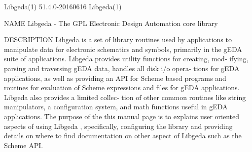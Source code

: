 Libgeda(1)                      51.4.0-20160616                     Libgeda(1)



NAME
       Libgeda - The GPL Electronic Design Automation core library

DESCRIPTION
       Libgeda is a set of library routines used by applications to manipulate
       data for electronic schematics and symbols, primarily in the gEDA suite
       of applications.  Libgeda provides utility functions for creating, mod-
       ifying, parsing and traversing gEDA data, handles all disk  i/o  opera-
       tions  for  gEDA  applications,  as well as providing an API for Scheme
       based programs and routines for evaluation of  Scheme  expressions  and
       files  for  gEDA applications.  Libgeda also provides a limited collec-
       tion of other common routines like string manipulators, a configuration
       system,  and math functions useful in gEDA applications. The purpose of
       the this manual page is to explains  user  oriented  aspects  of  using
       Libgeda  ,  specifically, configuring the library and providing details
       on where to find documentation on other aspect of Libgeda such  as  the
       Scheme API.

